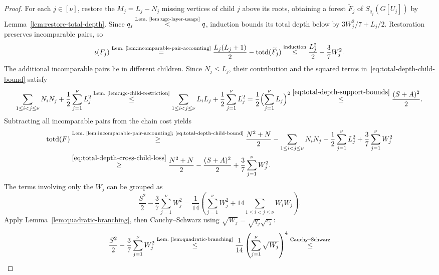 \begin{proof}
For each $j\in[\nu]$, restore the $M_j=L_j-N_j$ missing vertices of child $j$ above
its roots, obtaining a forest $\widetilde F_j$ of
$S_{q_j}(G[U_j])$ by Lemma~\ref{lem:restore-total-depth}.
Since $q_j\overset{\text{Lem.~\ref{lem:ugc-layer-usage}}}{<}q$,
induction bounds its total depth below by $3W_j^2/7+L_j/2$.
Restoration preserves incomparable pairs, so
\begin{equation}\label{eq:total-depth-child-bound}
 \iota(F_j)
 \overset{\text{Lem.~\ref{lem:incomparable-pair-accounting}}}{=}
 \frac{L_j(L_j+1)}2-\operatorname{totd}(\widetilde F_j)
 \overset{\text{induction}}{\leq}\frac{L_j^2}{2}-\frac37W_j^2.
\end{equation}
The additional incomparable pairs lie in different children.
Since $N_j\leq L_j$, their contribution and the squared terms
in~\eqref{eq:total-depth-child-bound} satisfy
\begin{equation}\label{eq:total-depth-cross-child-loss}
\sum_{1\leq i<j\leq\nu}N_iN_j+\frac12\sum_{j=1}^{\nu} L_j^2
 \overset{\text{Lem.~\ref{lem:ugc-child-restriction}}}{\leq}
 \sum_{1\leq i<j\leq\nu}L_iL_j+\frac12\sum_{j=1}^{\nu} L_j^2 =\frac12\Bigl(\sum_{j=1}^{\nu} L_j\Bigr)^2
 \overset{\eqref{eq:total-depth-support-bounds}}{\leq}\frac{(S+A)^2}{2}.
\end{equation}
Subtracting all incomparable pairs from the chain cost yields
\begin{equation}\label{eq:total-depth-combined-children}
\begin{aligned}
 \operatorname{totd}(F)&\overset{\text{Lem.~\ref{lem:incomparable-pair-accounting};
 \eqref{eq:total-depth-child-bound}}}{\geq}
 \frac{N^2+N}{2}-\sum_{1\leq i<j\leq\nu}N_iN_j
             -\frac12\sum_{j=1}^{\nu} L_j^2+\frac37\sum_{j=1}^{\nu} W_j^2\\
 &\overset{\eqref{eq:total-depth-cross-child-loss}}{\geq}
 \frac{N^2+N}{2}-\frac{(S+A)^2}{2}+\frac37\sum_{j=1}^{\nu} W_j^2.
\end{aligned}
\end{equation}
The terms involving only the $W_j$ can be grouped as
\[
 \frac{S^2}{2}-\frac37\sum_{j=1}^{\nu}W_j^2
 =\frac1{14}\left(\sum_{j=1}^{\nu}W_j^2
                  +14\sum_{1\leq i<j\leq\nu}W_iW_j\right).
\]
Apply Lemma~\ref{lem:quadratic-branching}, then Cauchy--Schwarz using
$\sqrt{W_j}=\sqrt{q_j}\sqrt{c_j}$:
\begin{equation}\label{eq:total-depth-quadratic-estimate}
\frac{S^2}{2}-\frac37\sum_{j=1}^{\nu} W_j^2
 \overset{\text{Lem.~\ref{lem:quadratic-branching}}}{\leq}
 \frac1{14}\left(\sum_{j=1}^{\nu} \sqrt{W_j}\right)^4 \overset{\text{Cauchy--Schwarz}}{\leq}

\end{equation}
\end{proof}
